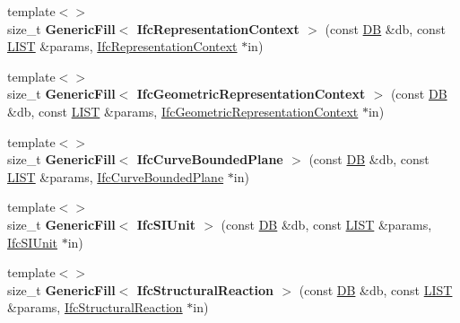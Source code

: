 \begin{DoxyCompactItemize}
\item 
\hypertarget{namespace_assimp_1_1_s_t_e_p_a7e67ec5a1c3b504d62bb9c5204a58f63}{{\footnotesize template$<$$>$ }\\size\+\_\+t {\bfseries Generic\+Fill$<$ Ifc\+Representation\+Context $>$} (const \hyperlink{class_assimp_1_1_s_t_e_p_1_1_d_b}{D\+B} \&db, const \hyperlink{class_assimp_1_1_s_t_e_p_1_1_e_x_p_r_e_s_s_1_1_l_i_s_t}{L\+I\+S\+T} \&params, \hyperlink{struct_assimp_1_1_i_f_c_1_1_ifc_representation_context}{Ifc\+Representation\+Context} $\ast$in)}\label{namespace_assimp_1_1_s_t_e_p_a7e67ec5a1c3b504d62bb9c5204a58f63}

\item 
\hypertarget{namespace_assimp_1_1_s_t_e_p_abcd8a2c4c85a294855ce96b111a84b96}{{\footnotesize template$<$$>$ }\\size\+\_\+t {\bfseries Generic\+Fill$<$ Ifc\+Geometric\+Representation\+Context $>$} (const \hyperlink{class_assimp_1_1_s_t_e_p_1_1_d_b}{D\+B} \&db, const \hyperlink{class_assimp_1_1_s_t_e_p_1_1_e_x_p_r_e_s_s_1_1_l_i_s_t}{L\+I\+S\+T} \&params, \hyperlink{struct_assimp_1_1_i_f_c_1_1_ifc_geometric_representation_context}{Ifc\+Geometric\+Representation\+Context} $\ast$in)}\label{namespace_assimp_1_1_s_t_e_p_abcd8a2c4c85a294855ce96b111a84b96}

\item 
\hypertarget{namespace_assimp_1_1_s_t_e_p_a51be4a1f6efca9a5e33e32693b41ed3a}{{\footnotesize template$<$$>$ }\\size\+\_\+t {\bfseries Generic\+Fill$<$ Ifc\+Curve\+Bounded\+Plane $>$} (const \hyperlink{class_assimp_1_1_s_t_e_p_1_1_d_b}{D\+B} \&db, const \hyperlink{class_assimp_1_1_s_t_e_p_1_1_e_x_p_r_e_s_s_1_1_l_i_s_t}{L\+I\+S\+T} \&params, \hyperlink{struct_assimp_1_1_i_f_c_1_1_ifc_curve_bounded_plane}{Ifc\+Curve\+Bounded\+Plane} $\ast$in)}\label{namespace_assimp_1_1_s_t_e_p_a51be4a1f6efca9a5e33e32693b41ed3a}

\item 
\hypertarget{namespace_assimp_1_1_s_t_e_p_af9ab7964f7685ddf08aac0682e431b82}{{\footnotesize template$<$$>$ }\\size\+\_\+t {\bfseries Generic\+Fill$<$ Ifc\+S\+I\+Unit $>$} (const \hyperlink{class_assimp_1_1_s_t_e_p_1_1_d_b}{D\+B} \&db, const \hyperlink{class_assimp_1_1_s_t_e_p_1_1_e_x_p_r_e_s_s_1_1_l_i_s_t}{L\+I\+S\+T} \&params, \hyperlink{struct_assimp_1_1_i_f_c_1_1_ifc_s_i_unit}{Ifc\+S\+I\+Unit} $\ast$in)}\label{namespace_assimp_1_1_s_t_e_p_af9ab7964f7685ddf08aac0682e431b82}

\item 
\hypertarget{namespace_assimp_1_1_s_t_e_p_a36193238541dbdebaef10c1d880b941d}{{\footnotesize template$<$$>$ }\\size\+\_\+t {\bfseries Generic\+Fill$<$ Ifc\+Structural\+Reaction $>$} (const \hyperlink{class_assimp_1_1_s_t_e_p_1_1_d_b}{D\+B} \&db, const \hyperlink{class_assimp_1_1_s_t_e_p_1_1_e_x_p_r_e_s_s_1_1_l_i_s_t}{L\+I\+S\+T} \&params, \hyperlink{struct_assimp_1_1_i_f_c_1_1_ifc_structural_reaction}{Ifc\+Structural\+Reaction} $\ast$in)}\label{namespace_assimp_1_1_s_t_e_p_a36193238541dbdebaef10c1d880b941d}


\end{DoxyCompactItemize}
